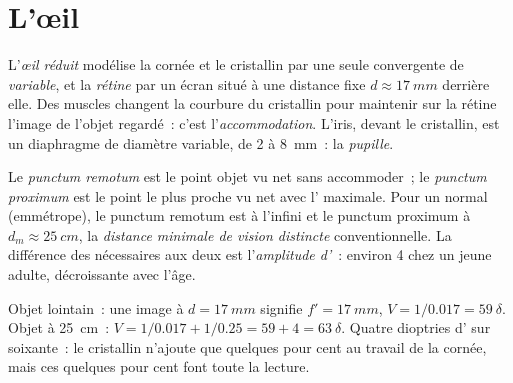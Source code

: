 \section{L'œil}

\begin{definition}\label{def:b1:optical-instruments:eye}
L'\emph{œil réduit} modélise la cornée et le cristallin par une seule
 convergente de  \emph{variable}, et la
\emph{rétine} par un écran situé à une distance fixe
$d \approx \qty{17}{mm}$ derrière elle. Des muscles changent la courbure
du cristallin pour maintenir sur la rétine l'image de l'objet
regardé~: c'est l'\emph{accommodation}. L'iris, devant le cristallin,
est un diaphragme de diamètre variable, de \qty{2}{} à \qty{8}{mm}~: la
\emph{pupille}.
\end{definition}

\begin{definition}\label{def:b1:optical-instruments:punctum}
Le \emph{punctum remotum} est le point objet vu net sans accommoder~; le
\emph{punctum proximum} est le point le plus proche vu net avec
l' maximale. Pour un  normal (emmétrope), le punctum
remotum est à l'infini et le punctum proximum à
$d_m \approx \qty{25}{cm}$, la \emph{distance minimale de vision
distincte} conventionnelle. La différence des  nécessaires aux
deux est l'\emph{amplitude d'}~: environ \qty{4}{\delta}
chez un jeune adulte, décroissante avec l'âge.
\end{definition}

\begin{example}\label{ex:b1:optical-instruments:vergence}
Objet lointain~: une image à $d = \qty{17}{mm}$ signifie $f' = \qty{17}{mm}$,
$V = 1/0.017 = \qty{59}{\delta}$. Objet à \qty{25}{cm}~:
$V = 1/0.017 + 1/0.25 = 59 + 4 = \qty{63}{\delta}$. Quatre dioptries
d' sur soixante~: le cristallin n'ajoute que quelques pour
cent au travail de la cornée, mais ces quelques pour cent font toute la
lecture.
\end{example}

